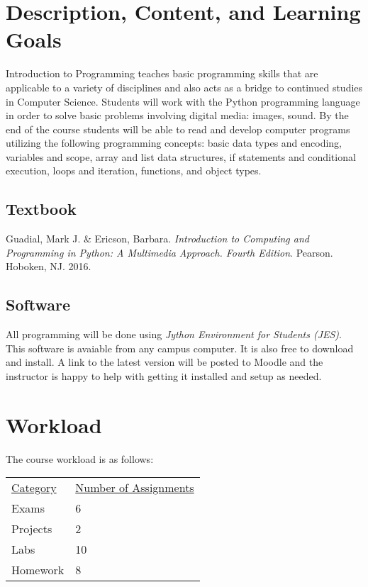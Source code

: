 \documentclass[10pt]{article}
\begin{document}
\section{Description, Content, and Learning Goals}

Introduction to Programming teaches basic programming skills that are applicable to a variety of disciplines and also acts as a bridge to continued studies in Computer Science. Students will work with the Python programming language in order to solve basic problems involving digital media: images, sound.  By the end of the course students will be able to read and develop computer programs utilizing the following programming concepts: basic data types and encoding, variables and scope, array and list data structures, if statements and conditional execution, loops and iteration, functions, and object types.

\subsection{Textbook}

\noindent
Guadial, Mark J. \& Ericson, Barbara. \textit{Introduction to Computing and Programming in Python: A Multimedia Approach. Fourth Edition}. Pearson. Hoboken, NJ. 2016. %

\subsection{Software}

All programming will be done using \textit{Jython Environment for Students (JES)}. This software is avaiable from any campus computer. It is also free to download and install. A link to the latest version will be posted to Moodle and the instructor is happy to help with getting it installed and setup as needed.

\section{Workload}

The course workload is as follows:
\begin{center}
  \begin{tabular}{ll}
    \underline{Category} & \underline{Number of Assignments} \\
    Exams & 6 \\
    Projects & 2 \\
    Labs & 10 \\
    Homework & 8
  \end{tabular}
\end{center}
\end{document}
